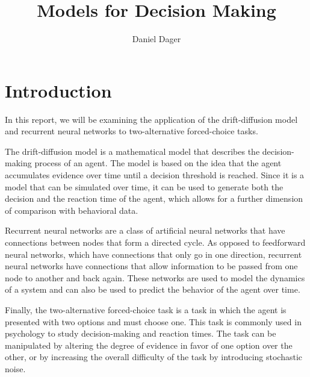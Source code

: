 \documentclass{article}
\makeatletter
\renewcommand{\maketitle}{
    {\raggedleft  %
    \vspace*{-10pt}  %
    {\large\@title \par}  %
    \vspace{5pt}  %
    {\normalsize\@author \par}
    \vspace{5pt}  %
    {\normalsize\@date \par}
    \vspace{20pt}}  %
}
\makeatother
\begin{document}
\title{Models for Decision Making}
\author{Daniel Dager}
\date{}
\maketitle

\pagestyle{empty} %
\thispagestyle{empty}

\renewcommand{\thesection}{1.\arabic{section}}


\section*{Introduction}

In this report, we will be examining the application of the drift-diffusion model and recurrent neural networks to two-alternative forced-choice tasks.
\vspace{1em}

The drift-diffusion model is a mathematical model that describes the decision-making process of an agent. The model is based on the idea that the agent accumulates evidence over time until a decision threshold is reached. Since it is a model that can be simulated over time, it can be used to generate both the decision and the reaction time of the agent, which allows for a further dimension of comparison with behavioral data.
\vspace{1em}

Recurrent neural networks are a class of artificial neural networks that have connections between nodes that form a directed cycle. As opposed to feedforward neural networks, which have connections that only go in one direction, recurrent neural networks have connections that allow information to be passed from one node to another and back again. These networks are used to model the dynamics of a system and can also be used to predict the behavior of the agent over time.
\vspace{1em}

Finally, the two-alternative forced-choice task is a task in which the agent is presented with two options and must choose one. This task is commonly used in psychology to study decision-making and reaction times. The task can be manipulated by altering the degree of evidence in favor of one option over the other, or by increasing the overall difficulty of the task by introducing stochastic noise. 
\vspace{1em}


\section{}
\end{document}
